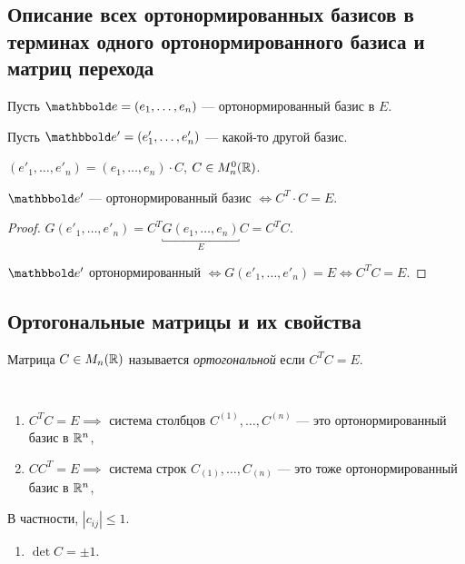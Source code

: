 \subsection{Описание всех ортонормированных базисов в терминах одного ортонормированного базиса и матриц перехода}

Пусть $\E = (e_1, \dots, e_n)$ --- ортонормированный базис в $E$.

Пусть $\E' = (e'_1, \dots, e'_n)$ --- какой-то другой базис.

$(e'_1, \dots, e'_n) = (e_1, \dots, e_n) \cdot C$, $C \in M_n^{0}(\mathbb{R})$.

\begin{proposal}
    $\E'$ --- ортонормированный базис $\iff C^{T} \cdot C = E$.
\end{proposal}

\begin{proof}
    $G(e'_1, \dots, e'_n) = C^{T} \underbracket{G(e_1, \dots, e_n)}_E C = C^{T} C$.

    $\E'$ ортонормированный $\iff G(e'_1, \dots, e'_n) = E \iff C^{T} C = E$.
\end{proof}


\subsection{Ортогональные матрицы и их свойства}

\begin{definition}
    Матрица $C \in M_n(\mathbb{R})$ называется \textit{ортогональной} если $C^{T} C = E$.
\end{definition}

\begin{comment}
    $C^{T} C = E \iff C C^{T} = E \iff C^{-1} = C^{T}$.
\end{comment}

\begin{properties}~
    \begin{enumerate}
    \item $C^{T} C = E \implies $ система столбцов $C^{(1)}, \dots, C^{(n)}$ --- это ортонормированный базис в $\mathbb{R}^n$,
    \item $C C^{T} = E \implies $ система строк $C_{(1)}, \dots, C_{(n)}$ --- это тоже ортонормированный базис в $\mathbb{R}^n$,
    \end{enumerate}
    В частности, $|c_{ij}| \leq 1$.
    \begin{enumerate}[resume]
    \item $\det C = \pm 1$.
    \end{enumerate}
\end{properties}


